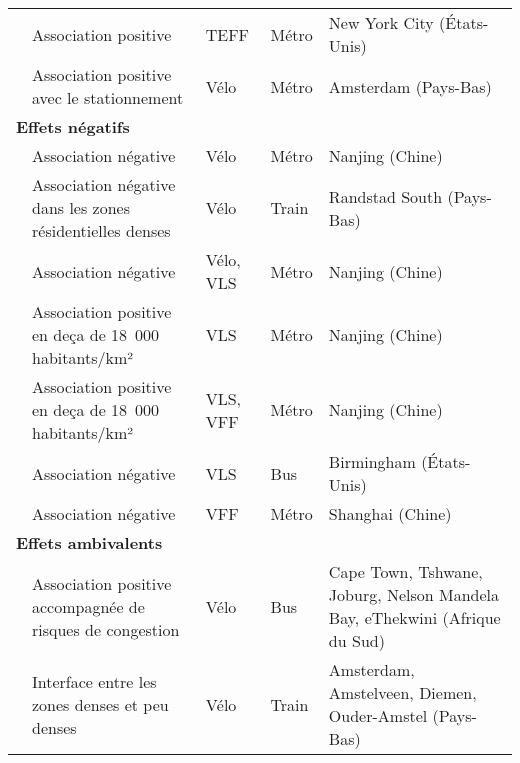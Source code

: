 \begin{longtable}{p{3cm}p{3cm}p{1.5cm}p{1.8cm}p{3.3cm}}
    \small{\textcite{lee_forecasting_2021}}\index{Lee, Mina|pagebf} & \small{Association positive} & \small{TEFF} & \small{Métro} & \small{New York City (États-Unis)}\\
    \small{\textcite{kampen_bicycle_2021}}\index{van Kampen, Jullian|pagebf} & \small{Association positive avec le stationnement} & \small{Vélo} & \small{Métro} & \small{Amsterdam (Pays-Bas)}\\
    \hline
\multicolumn{5}{l}{\textbf{Effets négatifs}}\\
    \small{\textcite{gan_associations_2021}}\index{Gan, Zuoxian|pagebf} & \small{Association négative} & \small{Vélo} & \small{Métro} & \small{Nanjing (Chine)}\\
    \small{\textcite{la_paix_puello_modelling_2015}}\index{La Paix Puello, Lissy|pagebf} & \small{Association négative dans les zones résidentielles denses} & \small{Vélo} & \small{Train} & \small{Randstad South (Pays-Bas)}\\
    \small{\textcite{ji_public_2017}}\index{Ji, Yanjie|pagebf} & \small{Association négative} & \small{Vélo, VLS} & \small{Métro} & \small{Nanjing (Chine)}\\
    \small{\textcite{cheng_promoting_2022}} & \small{Association positive en deça de 18~000  habitants/km²} & \small{VLS} & \small{Métro} & \small{Nanjing (Chine)}\\     
    \small{\textcite{cheng_comparison_2023}}\index{Cheng, Long|pagebf} & \small{Association positive en deça de 18~000  habitants/km²} & \small{VLS, VFF} & \small{Métro} & \small{Nanjing (Chine)}\\     
    \small{\textcite{glass_role_2020}}\index{Glass, Caroline|pagebf} & \small{Association négative} & \small{VLS} & \small{Bus} & \small{Birmingham (États-Unis)}\\
    \small{\textcite{hu_examining_2022}}\index{Hu, Songhua|pagebf} & \small{Association négative} & \small{VFF} & \small{Métro} & \small{Shanghai (Chine)}\\ 
    \hline
\multicolumn{5}{l}{\textbf{Effets ambivalents}}\\
    \small{\textcite{cooke_relationship_2018}}\index{Cooke, Sean|pagebf} & \small{Association positive accompagnée de risques de congestion} & \small{Vélo} & \small{Bus} & \small{Cape Town, Tshwane, Joburg, Nelson Mandela Bay, eThekwini (Afrique du Sud)}\\
    \small{\textcite{kager_characterisation_2016}}\index{Kager, Roland|pagebf} & \small{Interface entre les zones denses et peu denses} & \small{Vélo} & \small{Train} & \small{Amsterdam, Amstelveen, Diemen, Ouder-Amstel (Pays-Bas)}\\

\end{longtable}
